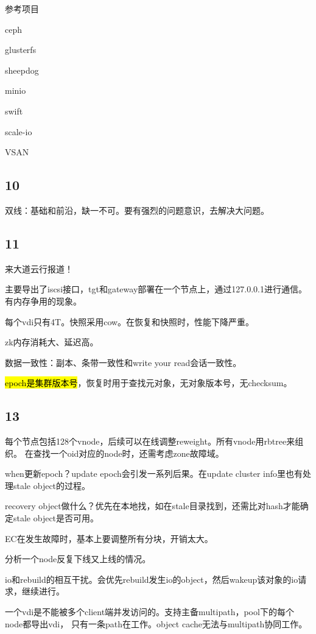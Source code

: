 参考项目
\begin{enumbox}
\item ceph
\item glusterfs
\item sheepdog
\item minio
\item swift
\item scale-io
\item VSAN
\end{enumbox}

\subsection{10}

双线：基础和前沿，缺一不可。要有强烈的问题意识，去解决大问题。

\subsection{11}

来大道云行报道！

主要导出了iscsi接口，tgt和gateway部署在一个节点上，通过127.0.0.1进行通信。有内存争用的现象。

每个vdi只有4T。快照采用cow。在恢复和快照时，性能下降严重。

zk内存消耗大、延迟高。

数据一致性：副本、条带一致性和write your read会话一致性。

\hl{epoch是集群版本号}，恢复时用于查找元对象，无对象版本号，无checksum。

\subsection{13}

每个节点包括128个vnode，后续可以在线调整reweight。所有vnode用rbtree来组织。
在查找一个oid对应的node时，还需考虑zone故障域。

when更新epoch？update epoch会引发一系列后果。在update cluster info里也有处理stale object的过程。

recovery object做什么？优先在本地找，如在stale目录找到，还需比对hash才能确定stale object是否可用。

EC在发生故障时，基本上要调整所有分块，开销太大。

分析一个node反复下线又上线的情况。

io和rebuild的相互干扰。会优先rebuild发生io的object，然后wakeup该对象的io请求，继续进行。

一个vdi是不能被多个client端并发访问的。支持主备multipath，pool下的每个node都导出vdi，
只有一条path在工作。object cache无法与multipath协同工作。

